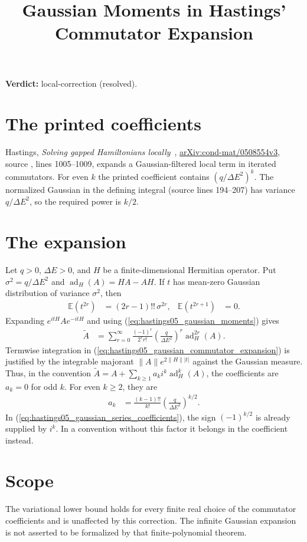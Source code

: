 \documentclass{article}
\title{Gaussian Moments in Hastings' Commutator Expansion}
\author{}
\date{}
\providecommand{\gapnote}[2]{\par\noindent\textbf{Verdict:} #1 (#2).\par}
\begin{document}
\maketitle
\gapnote{local-correction}{resolved}

\section{The printed coefficients}
Hastings, \emph{Solving gapped Hamiltonians locally}~\cite{Hastings2006Solving},
\href{https://arxiv.org/abs/cond-mat/0508554v3}{arXiv:cond-mat/0508554v3},
source , lines 1005--1009, expands a Gaussian-filtered
local term in iterated commutators. For even $k$ the printed coefficient
contains $(q/\Delta E^2)^k$. The normalized Gaussian in the defining
integral (source lines 194--207) has variance $q/\Delta E^2$, so the required
power is $k/2$.

\section{The expansion}
Let $q>0$, $\Delta E>0$, and $H$ be a finite-dimensional Hermitian operator.
Put $\sigma^2=q/\Delta E^2$ and $\operatorname{ad}_H(A)=HA-AH$. If $t$ has
mean-zero Gaussian distribution of variance $\sigma^2$, then
\begin{align}
 \mathbb E(t^{2r})&=(2r-1)!!\,\sigma^{2r}, &
 \mathbb E(t^{2r+1})&=0.
 \label{eq:hastings05_gaussian_moments}
\end{align}
Expanding $e^{itH}Ae^{-itH}$ and using
(\ref{eq:hastings05_gaussian_moments}) gives
\begin{align}
 \widetilde A
 &=\sum_{r=0}^{\infty}\frac{(-1)^r}{2^r r!}
       \left(\frac q{\Delta E^2}\right)^r
       \operatorname{ad}_H^{2r}(A).
 \label{eq:hastings05_gaussian_commutator_expansion}
\end{align}
Termwise integration in
(\ref{eq:hastings05_gaussian_commutator_expansion}) is justified by the integrable majorant
$\|A\|e^{2\|H\||t|}$ against the Gaussian measure. Thus, in the convention
$\widetilde A=A+\sum_{k\ge1}a_k i^k\operatorname{ad}_H^k(A)$, the coefficients
are $a_k=0$ for odd $k$. For even $k\ge2$, they are
\begin{align}
 a_k&=\frac{(k-1)!!}{k!}\left(\frac q{\Delta E^2}\right)^{k/2}.
 \label{eq:hastings05_gaussian_series_coefficients}
\end{align}
In (\ref{eq:hastings05_gaussian_series_coefficients}), the sign
$(-1)^{k/2}$ is already supplied by $i^k$. In a convention without
this factor it belongs in the coefficient instead.

\section{Scope}
The variational lower bound holds for every finite real choice of the
commutator coefficients and is unaffected by this correction. The
infinite Gaussian expansion is not asserted to be formalized by that
finite-polynomial theorem.


\end{document}
